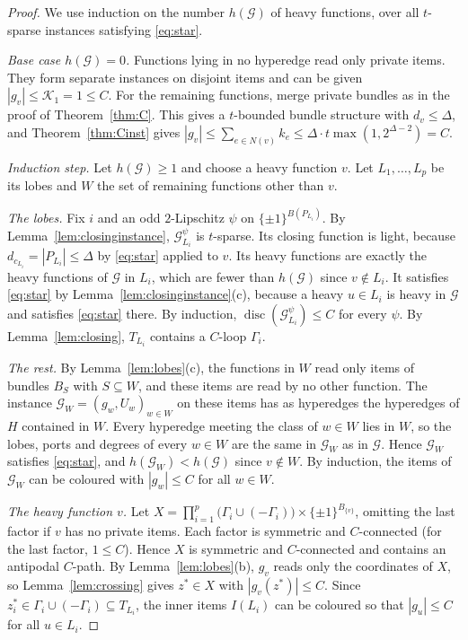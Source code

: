 \documentclass[11pt,letterpaper]{article}
\theoremstyle{definition}
\newcommand{\cG}{\mathcal{G}}
\newcommand{\cube}[1]{\{\pm1\}^{#1}}
\DeclareMathOperator{\disc}{disc}
\begin{document}
\begin{proof}
We use induction on the number $h(\cG)$ of heavy functions, over all $t$-sparse instances
satisfying \eqref{eq:star}.

\emph{Base case $h(\cG)=0$.} Functions lying in no hyperedge read only private items. They form
separate instances on disjoint items and can be given $|g_v|\le \mathcal{K}_1=1\le C$. For the remaining
functions, merge private bundles as in the proof of Theorem~\ref{thm:C}. This gives a $t$-bounded
bundle structure with $d_v\le\Delta$, and Theorem~\ref{thm:Cinst} gives $|g_v|\le\sum_{e\in
N(v)}k_e\le\Delta\cdot t\max(1,2^{\Delta-2})=C$.

\emph{Induction step.} Let $h(\cG)\ge1$ and choose a heavy function $v$. Let $L_1,\dots,L_p$ be its
lobes and $W$ the set of remaining functions other than $v$.

\smallskip\noindent\emph{The lobes.} Fix $i$ and an odd $2$-Lipschitz $\psi$ on
$\cube{B(P_{L_i})}$. By Lemma~\ref{lem:closinginstance}, $\cG_{L_i}^\psi$ is $t$-sparse. Its closing
function is light, because $d_{c_{L_i}}=|P_{L_i}|\le\Delta$ by \eqref{eq:star} applied to $v$. Its
heavy functions are exactly the heavy functions of $\cG$ in $L_i$, which are fewer than $h(\cG)$
since $v\notin L_i$. It satisfies \eqref{eq:star} by Lemma~\ref{lem:closinginstance}(c), because a
heavy $u\in L_i$ is heavy in $\cG$ and satisfies \eqref{eq:star} there. By induction,
$\disc(\cG_{L_i}^\psi)\le C$ for every $\psi$. By Lemma~\ref{lem:closing}, $T_{L_i}$ contains a
$C$-loop $\Gamma_i$.

\smallskip\noindent\emph{The rest.} By Lemma~\ref{lem:lobes}(c), the functions in $W$ read only
items of bundles $B_S$ with $S\subseteq W$, and these items are read by no other function. The
instance $\cG_W=(g_w,U_w)_{w\in W}$ on these items has as hyperedges the hyperedges of $H$
contained in $W$. Every hyperedge meeting the class of $w\in W$ lies in $W$, so the lobes, ports
and degrees of every $w\in W$ are the same in $\cG_W$ as in $\cG$. Hence $\cG_W$ satisfies
\eqref{eq:star}, and $h(\cG_W)<h(\cG)$ since $v\notin W$. By induction, the items of $\cG_W$ can be
coloured with $|g_w|\le C$ for all $w\in W$.

\smallskip\noindent\emph{The heavy function $v$.} Let
$X=\prod_{i=1}^p\bigl(\Gamma_i\cup(-\Gamma_i)\bigr)\times\cube{B_{\{v\}}}$, omitting the last factor
if $v$ has no private items. Each factor is symmetric and $C$-connected (for the last factor,
$1\le C$). Hence $X$ is symmetric and $C$-connected and contains an antipodal $C$-path. By
Lemma~\ref{lem:lobes}(b), $g_v$ reads only the coordinates of $X$, so Lemma~\ref{lem:crossing} gives
$z^*\in X$ with $|g_v(z^*)|\le C$. Since $z^*_i\in\Gamma_i\cup(-\Gamma_i)\subseteq T_{L_i}$, the inner
items $I(L_i)$ can be coloured so that $|g_u|\le C$ for all $u\in L_i$.


\end{proof}
\end{document}
